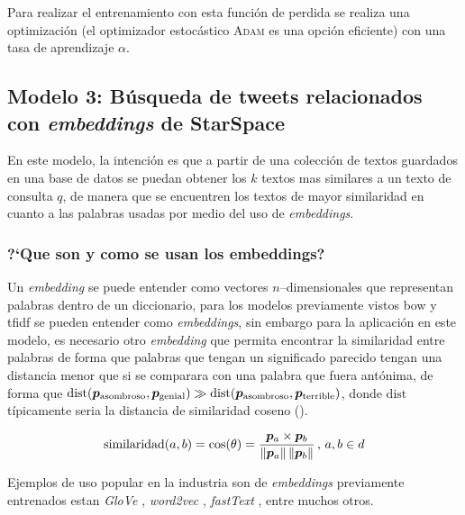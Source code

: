 Para realizar el entrenamiento con esta función de perdida se realiza una optimización (el optimizador estocástico \textsc{Adam} \cite{Kingma2014} es una opción eficiente) con una tasa de aprendizaje $\alpha$.


\subsection{Modelo 3: Búsqueda de tweets relacionados con \emph{embeddings} de \mbox{StarSpace}}
En este modelo, la intención es que a partir de una colección de textos guardados en una base de datos se puedan obtener los $k$ textos mas similares a un texto de consulta $q$, de manera que se encuentren los textos de mayor similaridad en cuanto a las palabras usadas por medio del uso de \emph{embeddings}.

\subsubsection{?`Que son y como se usan los embeddings?}
Un \emph{embedding} se puede entender como vectores $n$--dimensionales que representan palabras dentro de un diccionario, para los modelos previamente vistos \gls{bow} y \gls{tfidf} se pueden entender como \emph{embeddings}, sin embargo para la aplicación en este modelo, es necesario otro \emph{embedding} que permita encontrar la similaridad entre palabras de forma que palabras que tengan un significado parecido tengan una distancia menor que si se comparara con una palabra que fuera antónima, de forma que $\mathrm{dist}({\bm{p}}_{\mathrm{asombroso}}, {\bm{p}}_{\mathrm{genial}}) \gg \mathrm{dist}({\bm{p}}_{\mathrm{asombroso}}, {\bm{p}}_{\mathrm{terrible}})$, donde $\mathrm{dist}$ típicamente seria la distancia de similaridad coseno ().

\begin{equation} \label{eq:cosine-similarity}
  \mathrm{similaridad}(a, b) = \cos(\theta) = \frac{{\bm{p}}_a \times {\bm{p}}_b}{\left\lVert{\bm{p}}_a\right\rVert \left\lVert{\bm{p}}_b\right\rVert} \,,\, a, b \in d
\end{equation}

Ejemplos de uso popular en la industria son de \emph{embeddings} previamente entrenados estan \emph{GloVe} \cite{pennington2014glove}, \emph{word2vec} \cite{Mikolov2014}, \emph{fastText} \cite{joulin2016fasttext}, entre muchos otros.

